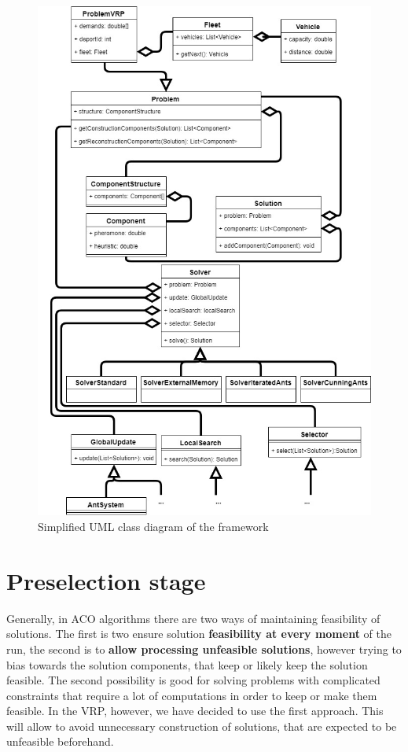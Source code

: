 \documentclass[11pt,a4paper,oneside]{book}
\begin{document}
\begin{figure}[H]
  \centering
    \includegraphics[scale=0.6]{uml-simple.jpg}
  \caption{Simplified UML class diagram of the framework}
  \label{fig:uml-simple}
\end{figure}

\section{Preselection stage}

Generally, in ACO algorithms there are two ways of maintaining feasibility of solutions. The first is two ensure solution \textbf{feasibility at every moment} of the run, the second is to \textbf{allow processing unfeasible solutions}, however trying to bias towards the solution components, that keep or likely keep the solution feasible. The second possibility is good for solving problems with complicated constraints that require a lot of computations in order to keep or make them feasible. In the VRP, however, we have decided to use the first approach. This will allow to avoid unnecessary construction of solutions, that are expected to be unfeasible beforehand. \par
\end{document}
